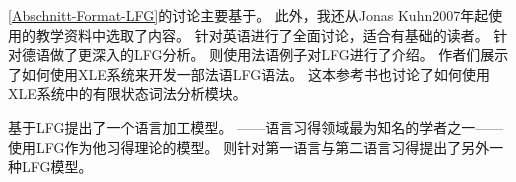 \ref{Abschnitt-Format-LFG}的讨论主要基于\citet{Dalrymple2001a-u,Dalrymple2006a}。
此外，我还从Jonas Kuhn2007年起使用的教学资料中选取了内容。
针对英语进行了全面讨论，适合有基础的读者。
针对德语做了更深入的LFG分析。
则使用法语例子对LFG进行了介绍。
作者们展示了如何使用XLE系统来开发一部法语LFG语法。
这本参考书也讨论了如何使用XLE系统中的有限状态词法分析模块。

\citet{Levelt89a}基于LFG提出了一个语言加工模型。
\citet{Pinker84a-u}——语言习得领域最为知名的学者之一——使用LFG作为他习得理论的模型。
则针对第一语言与第二语言习得提出了另外一种LFG模型。 


